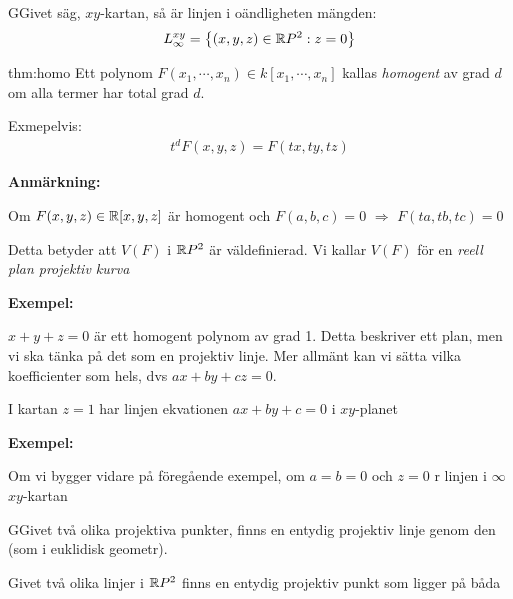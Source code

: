 \par\bigskip
\begin{theo}
  GGivet säg, $xy$-kartan, så är linjen i oändligheten mängden:
  \begin{equation*}
    \begin{gathered}
      L_{\infty}^{xy} = \left\{(x,y,z)\in\mathbb{R} P^2 : z=0\right\}
    \end{gathered}
  \end{equation*}
\end{theo}
\par\bigskip
\begin{theo}{thm:homo}
  Ett polynom $F(x_1,\cdots,x_n)\in k[x_1,\cdots, x_n]$ kallas \textit{homogent} av grad $d$ om alla termer har total grad $d$.\par
  \noindent Exmepelvis:
  \begin{equation*}
    \begin{gathered}
      t^dF(x,y,z)=F(tx,ty,tz)
    \end{gathered}
  \end{equation*}
\end{theo}
\par\bigskip
\noindent\textbf{Anmärkning:}\par
\noindent Om $F(x,y,z)\in\mathbb{R}[x,y,z]$ är homogent och $F(a,b,c)=0$ $\Rightarrow$ $F(ta,tb,tc)=0$\par
\noindent Detta betyder att $V(F)$ i $\mathbb{R} P^2$ är väldefinierad. Vi kallar $V(F)$ för en \textit{reell plan projektiv kurva} 
\par\bigskip
\noindent\textbf{Exempel:}\par
\noindent $x+y+z=0$ är ett homogent polynom av grad 1. Detta beskriver ett plan, men vi ska tänka på det som en projektiv linje. Mer allmänt kan vi sätta vilka koefficienter som hels, dvs $ax+by+cz=0$.\par
\noindent I kartan $z=1$ har linjen ekvationen $ax+by+c=0$ i $xy$-planet
\par\bigskip
\noindent\textbf{Exempel:}\par
\noindent Om vi bygger vidare på föregående exempel, om $a=b=0$ och $z=0$ r linjen i $\infty$ $xy$-kartan
\par\bigskip
\begin{theo}
  GGivet två olika projektiva punkter, finns en entydig projektiv linje genom den (som i euklidisk geometr).
  \par\bigskip
  \noindent Givet två olika linjer i $\mathbb{R} P^2$ finns en entydig projektiv punkt som ligger på båda
\end{theo}
